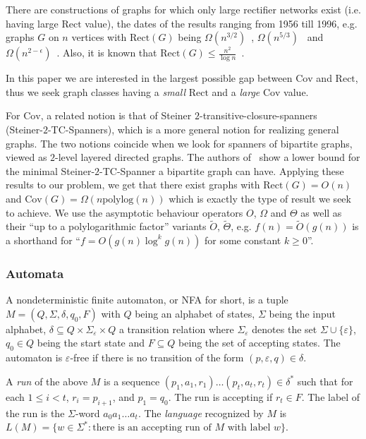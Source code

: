 \documentclass[submission]{llncs}
\def\Cov{{\mathrm{Cov}}}
\def\Rect{{\mathrm{Rect}}}
\begin{document}
  There are constructions of graphs for which only large rectifier networks exist (i.e. having large $\Rect$ value), the dates of the results ranging
  from 1956 till 1996, e.g. graphs $G$ on $n$ vertices with
  $\Rect(G)$ being $\Omega(n^{3/2})$~\cite{Nechiporuk}, $\Omega(n^{5/3})$~\cite{Mehlhorn,Pippenger:1976:SGA:321958.321962,Wegener}
  and $\Omega(n^{2-\epsilon})$~\cite{kollar1996norm}. Also, it is known that $\Rect(G)\leq \frac{n^2}{\log n}$~\cite{Lupanov}.

  In this paper we are interested in the largest possible gap between $\Cov$ and $\Rect$, thus we seek graph classes having a
  \emph{small} $\Rect$ and a \emph{large} $\Cov$ value.

  For $\Cov$, a related notion is that of Steiner $2$-transitive-closure\--spanners~\cite{BermanEtal} (Steiner-$2$-TC-Spanners),
  which is a more general notion for realizing general graphs. The two notions coincide when we look for
  spanners of bipartite graphs, viewed as $2$-level layered directed graphs.
  The authors of~\cite{BermanEtal} show a lower bound for the minimal Steiner-$2$-TC-Spanner a bipartite graph can have.
  Applying these results to our problem, we get that there exist graphs with $\Rect(G)=O(n)$ and $\Cov(G)=\Omega(n\mathrm{polylog}(n))$
  which is exactly the type of result we seek to achieve.
We use the asymptotic behaviour operators $O$, $\Omega$ and $\Theta$ as well as their ``up to a polylogarithmic factor'' variants
  $\tilde{O}$, $\tilde{\Theta}$, e.g. $f(n)=\tilde{O}(g(n))$ is a shorthand for ``$f=O(g(n)\log^kg(n))$ for some constant $k\geq 0$''.
\subsubsection{Automata}
  A nondeterministic finite automaton, or NFA for short, is a tuple $M=(Q,\Sigma,\delta,q_0,F)$ with $Q$ being an alphabet of states,
  $\Sigma$ being the input alphabet, $\delta\subseteq Q\times\Sigma_\varepsilon\times Q$ a transition relation where
  $\Sigma_\varepsilon$ denotes the set $\Sigma\cup\{\varepsilon\}$, $q_0\in Q$ being the start state and $F\subseteq Q$ being
  the set of accepting states. The automaton is $\varepsilon$-free if there is no transition of the form $(p,\varepsilon,q)\in\delta$.

  A \emph{run} of the above $M$ is a sequence $(p_1,a_1,r_1)\ldots(p_t,a_t,r_t)\in \delta^*$ such that for each
  $1\leq i<t$, $r_{i}=p_{i+1}$, and $p_1=q_0$. The run is accepting if $r_t\in F$. The label of the run is the $\Sigma$-word
  $a_0a_1\ldots a_t$. The \emph{language} recognized by $M$ is $L(M)=\{w\in \Sigma^*:\textrm{there is an accepting run of }M\textrm{ with label }w\}$.
\end{document}
